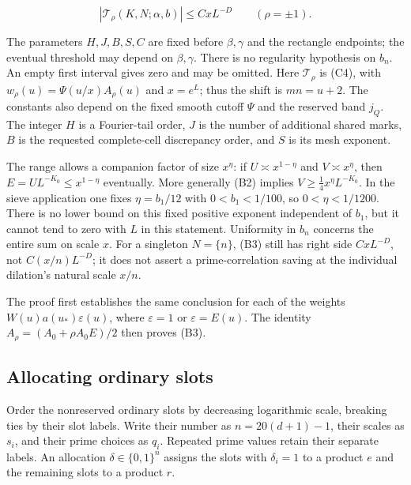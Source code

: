 \[
|\mathcal T_\rho(K,N;\alpha,b)|\le CxL^{-D}
\qquad(\rho=\pm1). \tag{B3}
\]

The parameters \(H,J,B,S,C\) are fixed before \(\beta,\gamma\) and the
rectangle endpoints; the eventual threshold may depend on
\(\beta,\gamma\). There is no regularity hypothesis on \(b_n\). An empty
first interval gives zero and may be omitted. Here \(\mathcal T_\rho\)
is (C4), with \(w_\rho(u)= \Psi(u/x)A_\rho(u)\) and \(x=e^L\); thus the
shift is \(mn=u+2\). The constants also depend on the fixed smooth
cutoff \(\Psi\) and the reserved band \(j_Q\). The integer \(H\) is a
Fourier-tail order, \(J\) is the number of additional shared marks,
\(B\) is the requested complete-cell discrepancy order, and \(S\) is its
mesh exponent.

The range allows a companion factor of size \(x^\eta\): if
\(U\asymp x^{1-\eta}\) and \(V\asymp x^\eta\), then
\(E=UL^{-K_0}\le x^{1-\eta}\) eventually. More generally (B2) implies
\(V\ge\tfrac14x^\eta L^{-K_0}\). In the sieve application one fixes
\(\eta=b_1/12\) with \(0<b_1<1/100\), so \(0<\eta<1/1200\). There is no
lower bound on this fixed positive exponent independent of \(b_1\), but
it cannot tend to zero with \(L\) in this statement. Uniformity in
\(b_n\) concerns the entire sum on scale \(x\). For a singleton
\(N=\{n\}\), (B3) still has right side \(CxL^{-D}\), not
\(C(x/n)L^{-D}\); it does not assert a prime-correlation saving at the
individual dilation's natural scale \(x/n\).

The proof first establishes the same conclusion for each of the weights
\(W(u)a(u_*)\varepsilon(u)\), where \(\varepsilon=1\) or
\(\varepsilon=E(u)\). The identity \(A_\rho=(A_0+\rho A_0E)/2\) then
proves (B3).


\hypertarget{bilinear-allocating-ordinary-slots}{%
\subsection{Allocating ordinary
slots}\label{bilinear-allocating-ordinary-slots}}

Order the nonreserved ordinary slots by decreasing logarithmic scale,
breaking ties by their slot labels. Write their number as
\(n=20(d+1)-1\), their scales as \(s_i\), and their prime choices as
\(q_i\). Repeated prime values retain their separate labels. An
allocation \(\delta\in\{0,1\}^n\) assigns the slots with \(\delta_i=1\)
to a product \(e\) and the remaining slots to a product \(r\).

